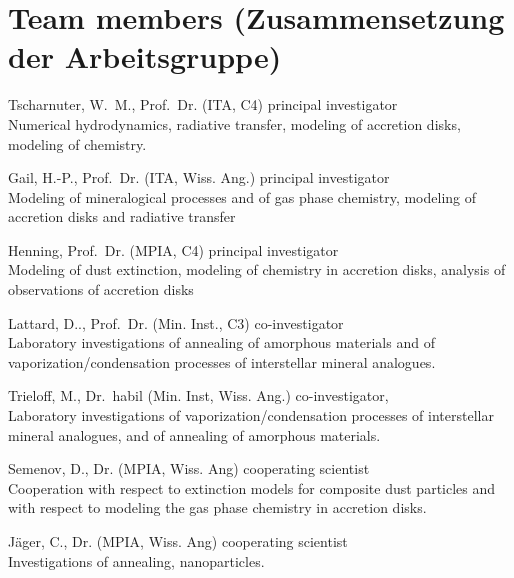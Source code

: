 \section{Team members (Zusammensetzung der Arbeitsgruppe)}
%
%
\begin{teamlist}
\item[Tscharnuter, W.~M., Prof.~Dr. (ITA, C4)] principal investigator\\
Numerical hydrodynamics, radiative transfer, modeling of accretion disks,
modeling of chemistry.

\item[Gail, H.-P., Prof.~Dr. (ITA, Wiss. Ang.)] principal investigator\\
Modeling of mineralogical processes and of gas phase chemistry, modeling of
accretion disks and radiative transfer

\item[Henning, Prof.~Dr. (MPIA, C4)] principal investigator\\
Modeling of dust extinction, modeling of chemistry in accretion disks,
analysis of observations of accretion disks

\item[Lattard, D.., Prof.~Dr. (Min. Inst., C3)] co-investigator\\
Laboratory investigations of annealing of amorphous materials and
of vaporization/condensation processes of interstellar mineral
analogues.

\item[Trieloff, M., Dr.~habil (Min. Inst, Wiss. Ang.)] co-investigator, \mbox{}\\
Laboratory investigations of vaporization/condensation processes of
interstellar mineral analogues, and of annealing of amorphous materials.

\item[Semenov, D., Dr. (MPIA, Wiss. Ang)] cooperating scientist\\
Cooperation with respect to extinction models for composite dust particles and
with respect to modeling the gas phase chemistry in accretion disks.

\item[J\"ager, C., Dr. (MPIA, Wiss. Ang)] cooperating scientist\\
Investigations of annealing, nanoparticles.

% 

\end{teamlist}
\vspace{1em}



